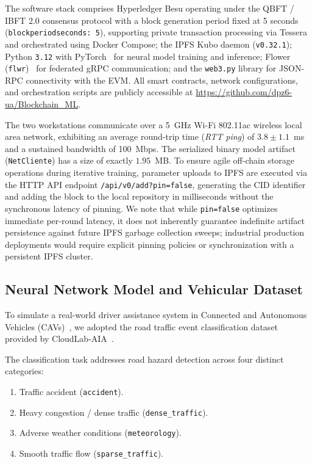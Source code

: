 The software stack comprises Hyperledger Besu operating under the QBFT / IBFT 2.0 consensus protocol with a block generation period fixed at 5 seconds (\texttt{blockperiodseconds: 5}), supporting private transaction processing via Tessera and orchestrated using Docker Compose; the IPFS Kubo daemon (\texttt{v0.32.1}); Python \texttt{3.12} with PyTorch~\cite{paszke2019pytorch} for neural model training and inference; Flower (\texttt{flwr})~\cite{beutel2020flower} for federated gRPC communication; and the \texttt{web3.py} library for JSON-RPC connectivity with the EVM. All smart contracts, network configurations, and orchestration scripts are publicly accessible at \url{https://github.com/dpz6-ua/Blockchain_ML}.

The two workstations communicate over a 5~GHz Wi-Fi 802.11ac wireless local area network, exhibiting an average round-trip time (\textit{RTT ping}) of $3.8 \pm 1.1$~ms and a sustained bandwidth of 100~Mbps. The serialized binary model artifact (\texttt{NetCliente}) has a size of exactly $1.95$~MB. To ensure agile off-chain storage operations during iterative training, parameter uploads to IPFS are executed via the HTTP API endpoint \texttt{/api/v0/add?pin=false}, generating the CID identifier and adding the block to the local repository in milliseconds without the synchronous latency of pinning. We note that while \texttt{pin=false} optimizes immediate per-round latency, it does not inherently guarantee indefinite artifact persistence against future IPFS garbage collection sweeps; industrial production deployments would require explicit pinning policies or synchronization with a persistent IPFS cluster.

\subsection{Neural Network Model and Vehicular Dataset}
To simulate a real-world driver assistance system in Connected and Autonomous Vehicles (CAVs)~\cite{chellapandi2024federated}, we adopted the road traffic event classification dataset provided by CloudLab-AIA~\cite{cloudlabaia_flblockchain}.

The classification task addresses road hazard detection across four distinct categories:
\begin{enumerate}
    \item Traffic accident (\texttt{accident}).
    \item Heavy congestion / dense traffic (\texttt{dense\_traffic}).
    \item Adverse weather conditions (\texttt{meteorology}).
    \item Smooth traffic flow (\texttt{sparse\_traffic}).
\end{enumerate}

